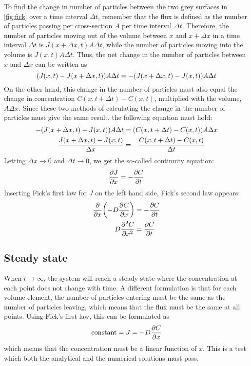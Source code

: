 \documentclass[12pt,english,a4paper]{article}
\begin{document}
To find the change in number of particles between the two grey surfaces in \vref{fig:fick} over a time interval \(\Delta t\), remember that the flux is defined as the number of particles passing per cross-section \(A\) per time interval \(\Delta t\). Therefore, the number of particles moving out of the volume between \(x\) and \(x+\Delta x\) in a time interval \(\Delta t\) is \(J(x+\Delta x,t)A\Delta t\), while the number of particles moving into the volume is \(J(x,t)A\Delta t\). Thus, the net change in the number of particles between \(x\) and \(\Delta x\) can be written as
\[
    \qty(J(x,t) - J(x + \Delta x,t))A\Delta t = -\qty(J(x+\Delta x,t) - J(x,t))A\Delta t
\]
On the other hand, this change in the number of particles must also equal the change in concentration \(C(x,t+\Delta t) - C(x,t)\), multiplied with the volume, \(A\Delta x\). Since these two methods of calculating the change in the number of particles must give the same result, the following equation must hold:
\begin{alignat*}{2}
    -\qty(J(x+\Delta x,t) - J(x,t))A\Delta t &= \qty(C(x,t+\Delta t) - C(x,t)) A\Delta x\\
    \frac{J(x+\Delta x,t) - J(x,t)}{\Delta x} &= -\frac{C(x,t+\Delta t) - C(x,t)}{\Delta t}
\end{alignat*}
Letting \(\Delta x\to0\) and \(\Delta t\to0\), we get the so-called continuity equation:
\[
    \pdv{J}{x} = -\pdv{C}{t}
\]
Inserting Fick's first law for \(J\) on the left hand side, Fick's second law appears:
\begin{alignat*}{2}
    \pdv{x}\qty(-D\pdv{C}{x}) &= -\pdv{C}{t}\\
    D\pdv[2]{C}{x} &= \pdv{C}{t}
\end{alignat*}

\subsection{Steady state}\label{steadystate}
When \(t\to\infty\), the system will reach a steady state where the concentration at each point does not change with time. A different formulation is that for each volume element, the number of particles entering must be the same as the number of particles leaving, which means that the flux must be the same at all points. Using Fick's first law, this can be formulated as
\[
\text{constant} = J = -D\pdv{C}{x}
\]
which means that the concentration must be a linear function of \(x\). This is a test which both the analytical and the numerical solutions must pass.
\end{document}
